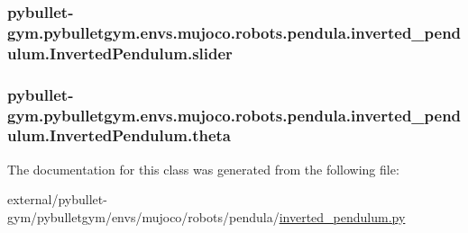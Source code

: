 \subsubsection[{\texorpdfstring{slider}{slider}}]{\setlength{\rightskip}{0pt plus 5cm}pybullet-\/gym.\+pybulletgym.\+envs.\+mujoco.\+robots.\+pendula.\+inverted\+\_\+pendulum.\+Inverted\+Pendulum.\+slider}\hypertarget{classpybullet-gym_1_1pybulletgym_1_1envs_1_1mujoco_1_1robots_1_1pendula_1_1inverted__pendulum_1_1_inverted_pendulum_a531dbbbeea07c1cf698d4550c9caa502}{}\label{classpybullet-gym_1_1pybulletgym_1_1envs_1_1mujoco_1_1robots_1_1pendula_1_1inverted__pendulum_1_1_inverted_pendulum_a531dbbbeea07c1cf698d4550c9caa502}
\subsubsection[{\texorpdfstring{theta}{theta}}]{\setlength{\rightskip}{0pt plus 5cm}pybullet-\/gym.\+pybulletgym.\+envs.\+mujoco.\+robots.\+pendula.\+inverted\+\_\+pendulum.\+Inverted\+Pendulum.\+theta}\hypertarget{classpybullet-gym_1_1pybulletgym_1_1envs_1_1mujoco_1_1robots_1_1pendula_1_1inverted__pendulum_1_1_inverted_pendulum_af3ae09eae1074ee388fa9e6131ed05e3}{}\label{classpybullet-gym_1_1pybulletgym_1_1envs_1_1mujoco_1_1robots_1_1pendula_1_1inverted__pendulum_1_1_inverted_pendulum_af3ae09eae1074ee388fa9e6131ed05e3}


The documentation for this class was generated from the following file\+:\begin{DoxyCompactItemize}
\item 
external/pybullet-\/gym/pybulletgym/envs/mujoco/robots/pendula/\hyperlink{inverted__pendulum_8py}{inverted\+\_\+pendulum.\+py}\end{DoxyCompactItemize}
